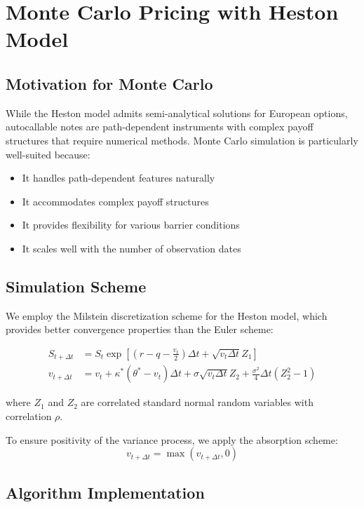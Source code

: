 \documentclass[12pt,a4paper]{article}
\begin{document}
\section{Monte Carlo Pricing with Heston Model}

\subsection{Motivation for Monte Carlo}

While the Heston model admits semi-analytical solutions for European options, autocallable notes are path-dependent instruments with complex payoff structures that require numerical methods. Monte Carlo simulation is particularly well-suited because:

\begin{itemize}
    \item It handles path-dependent features naturally
    \item It accommodates complex payoff structures
    \item It provides flexibility for various barrier conditions
    \item It scales well with the number of observation dates
\end{itemize}

\subsection{Simulation Scheme}

We employ the Milstein discretization scheme for the Heston model, which provides better convergence properties than the Euler scheme:

\begin{align}
S_{t+\Delta t} &= S_t \exp\left[(r-q-\frac{v_t}{2})\Delta t + \sqrt{v_t \Delta t} Z_1\right]\\
v_{t+\Delta t} &= v_t + \kappa^*(\theta^* - v_t)\Delta t + \sigma\sqrt{v_t \Delta t} Z_2 + \frac{\sigma^2}{4}\Delta t(Z_2^2 - 1)
\end{align}

where $Z_1$ and $Z_2$ are correlated standard normal random variables with correlation $\rho$.

To ensure positivity of the variance process, we apply the absorption scheme:
\begin{equation}
v_{t+\Delta t} = \max(v_{t+\Delta t}, 0)
\end{equation}

\subsection{Algorithm Implementation}
\end{document}
